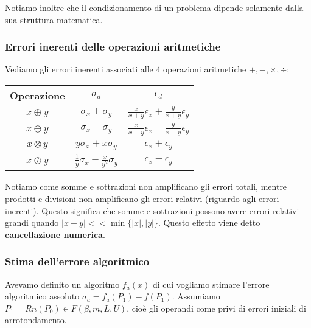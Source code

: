 \documentclass[a4paper,11pt]{article}
\begin{document}
Notiamo inoltre che il condizionamento di un problema dipende solamente dalla sua struttura matematica. 

\subsubsection{Errori inerenti delle operazioni aritmetiche}
Vediamo gli errori inerenti associati alle 4 operazioni aritmetiche $+, -, \times, \div$:
\begin{table}[H]
	\center {}
	\begin{tabular} { c | c | c }
		\bfseries Operazione & $\sigma_d$ & $\epsilon_d$ \\
		\hline
		$x \oplus y$ & $\sigma_x + \sigma_y$ & $\frac{x}{x + y} \epsilon_x + \frac{y}{x + y} \epsilon_y$ \\ 
		$x \ominus y$ & $\sigma_x - \sigma_y$ & $\frac{x}{x - y} \epsilon_x - \frac{y}{x - y} \epsilon_y$ \\ 
		$x \otimes y$ & $y\sigma_x + x\sigma_y$ & $\epsilon_x + \epsilon_y$ \\ 
		$x \oslash y$ & $\frac{1}{y}\sigma_x - \frac{x}{y^2}\sigma_y$ & $\epsilon_x - \epsilon_y$ \\ 
	\end{tabular}
\end{table}

Notiamo come somme e sottrazioni non amplificano gli errori totali, mentre prodotti e divisioni non amplificano gli errori relativi (riguardo agli errori inerenti).
Questo significa che somme e sottrazioni possono avere errori relativi grandi quando $|x + y| << \min \{ |x|, |y|\}$. 
Questo effetto viene detto \textbf{cancellazione numerica}.

\subsubsection{Stima dell'errore algoritmico} 
Avevamo definito un algoritmo $f_a(x)$ di cui vogliamo stimare l'errore algoritmico assoluto $\sigma_a = f_a(P_1) - f(P_1)$.
Assumiamo $P_1 = Rn(P_0) \in F(\beta, m, L, U)$, cioè gli operandi come privi di errori iniziali di arrotondamento. 
\end{document}
